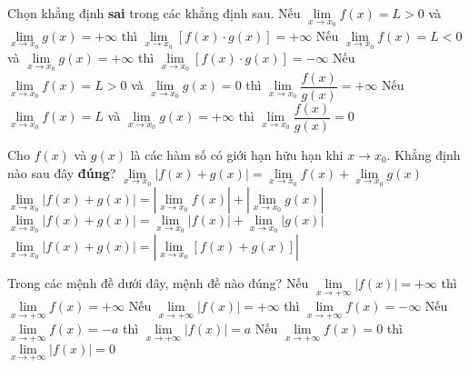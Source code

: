 \begin{ex}%
	Chọn khẳng định \textbf{sai} trong các khẳng định sau.
	\choice
	{Nếu $\lim\limits_{x\to x_0}f(x)=L>0$ và $\lim\limits_{x\to x_0}g(x)=+\infty$ thì $\lim\limits_{x\to x_0}[f(x)\cdot g(x)]=+\infty$}
	{Nếu $\lim\limits_{x\to x_0}f(x)=L<0$ và $\lim\limits_{x\to x_0}g(x)=+\infty$ thì $\lim\limits_{x\to x_0}[f(x)\cdot g(x)]=-\infty$}
	{\True Nếu $\lim\limits_{x\to x_0}f(x)=L>0$ và $\lim\limits_{x\to x_0}g(x)=0$ thì $\lim\limits_{x\to x_0}\dfrac{f(x)}{g(x)}=+\infty$}
	{Nếu $\lim\limits_{x\to x_0}f(x)=L$ và $\lim\limits_{x\to x_0}g(x)=+\infty$ thì $\lim\limits_{x\to x_0}\dfrac{f(x)}{g(x)}=0$}
\end{ex}
\begin{ex}%
	Cho $f(x)$ và $g(x)$ là các hàm số có giới hạn hữu hạn khi $x\to x_0$. Khẳng định nào sau đây \textbf{đúng}?
	\choice
	{$\lim\limits_{x\to x_0}|f(x)+g(x)|=\lim\limits_{x\to x_0}f(x)+\lim\limits_{x\to x_0}g(x)$}
	{$\lim\limits_{x\to x_0}|f(x)+g(x)|=\left|\lim\limits_{x\to x_0}f(x)\right|+\left|\lim\limits_{x\to x_0}g(x)\right|$}
	{$\lim\limits_{x\to x_0}|f(x)+g(x)|=\lim\limits_{x\to x_0}|f(x)|+\lim\limits_{x\to x_0}|g(x)|$}
	{\True $\lim\limits_{x\to x_0}|f(x)+g(x)|=\left|\lim\limits_{x\to x_0}\left[f(x)+g(x)\right]\right|$}
\end{ex}

\begin{ex}%
	Trong các mệnh đề dưới đây, mệnh đề nào đúng?
	\choice
	{Nếu $\lim\limits_{x\to +\infty}|f(x)|=+\infty$ thì $\lim\limits_{x\to +\infty}f(x)=+\infty$}
	{Nếu $\lim\limits_{x\to +\infty}|f(x)|=+\infty$ thì $\lim\limits_{x\to +\infty}f(x)=-\infty$}
	{Nếu $\lim\limits_{x\to +\infty}f(x)=-a$ thì $\lim\limits_{x\to +\infty}|f(x)|=a$}
	{\True Nếu $\lim\limits_{x\to +\infty}f(x)=0$ thì $\lim\limits_{x\to +\infty}|f(x)|=0$}
\end{ex}


